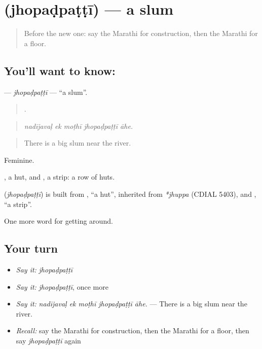 \section[\texorpdfstring{\mr{झोपडपट्टी} (jhopaḍpaṭṭī)}{झोपडपट्टी (jhopaḍpaṭṭī)}]{ (jhopaḍpaṭṭī) — a slum}

\label{lesson:MR-C421-jhopadpatti}



\begin{quote}
Before the new one: say the Marathi for construction, then the Marathi for a floor.
\end{quote}

\subsection*{You'll want to know: }
\textbf{} — \emph{jhopaḍpaṭṭī} — \textquotedblleft{}a slum\textquotedblright{}.

\begin{quote}
    .
\end{quote}

\begin{quote}
\emph{nadījavaḷ ek moṭhī jhopaḍpaṭṭī āhe.}
\end{quote}

\begin{quote}
There is a big slum near the river.
\end{quote}

Feminine.

, a hut, and , a strip: a row of huts.

\begin{cousinweb}
\textbf{} (\emph{jhopaḍpaṭṭī}) is built from \textbf{}, \textquotedblleft{}a hut\textquotedblright{}, inherited from \emph{*jhuppa} (CDIAL 5403), and \textbf{}, \textquotedblleft{}a strip\textquotedblright{}.
\end{cousinweb}

\begin{grammarlens}[title={What you've built}]
One more word for getting around.
\end{grammarlens}

\subsection*{Your turn}
\begin{itemize}
\raggedright
  \item \emph{Say it:} \emph{jhopaḍpaṭṭī}
  \item \emph{Say it:} \emph{jhopaḍpaṭṭī}, once more
  \item \emph{Say it:} \emph{nadījavaḷ ek moṭhī jhopaḍpaṭṭī āhe.} — There is a big slum near the river.
  \item \emph{Recall:} say the Marathi for construction, then the Marathi for a floor, then say \emph{jhopaḍpaṭṭī} again
\end{itemize}


